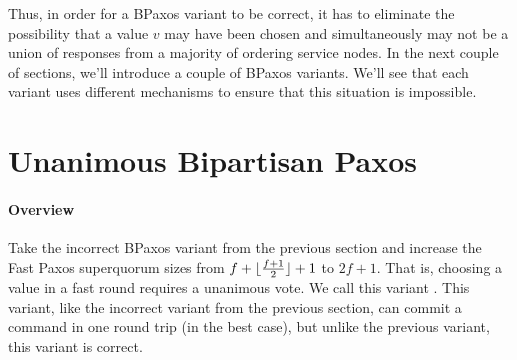 \documentclass{mwhittaker}
\theoremstyle{definition}
\begin{document}
Thus, in order for a BPaxos variant to be correct, it has to eliminate the
possibility that a value $v$ may have been chosen and simultaneously may not be
a union of responses from a majority of ordering service nodes. In the next
couple of sections, we'll introduce a couple of BPaxos variants. We'll see that
each variant uses different mechanisms to ensure that this situation is
impossible.

\section{Unanimous Bipartisan Paxos}
\paragraph{Overview}
Take the incorrect BPaxos variant from the previous section and increase the
Fast Paxos superquorum sizes from $f + \lfloor\frac{f+1}{2}\rfloor + 1$ to $2f + 1$.
That is, choosing a value in a fast round requires a unanimous vote. We call
this variant . This variant, like the incorrect
variant from the previous section, can commit a command in one round trip (in
the best case), but unlike the previous variant, this variant is correct.
\end{document}
